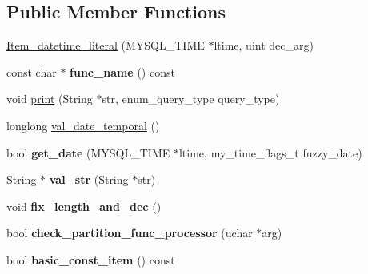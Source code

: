 \subsection*{Public Member Functions}
\begin{DoxyCompactItemize}
\item 
\mbox{\hyperlink{classItem__datetime__literal_a6a462ca295dad345d98d1fc6fa3e6f4d}{Item\+\_\+datetime\+\_\+literal}} (M\+Y\+S\+Q\+L\+\_\+\+T\+I\+ME $\ast$ltime, uint dec\+\_\+arg)
\item 
\mbox{\label{classItem__datetime__literal_a45fe15923fdd61306e141e29367ec34c}} 
const char $\ast$ {\bfseries func\+\_\+name} () const
\item 
void \mbox{\hyperlink{classItem__datetime__literal_a96ac54156ec3267f4913e3fbed7837a1}{print}} (String $\ast$str, enum\+\_\+query\+\_\+type query\+\_\+type)
\item 
longlong \mbox{\hyperlink{classItem__datetime__literal_af205497e535eba297fbdd01b60bb93d9}{val\+\_\+date\+\_\+temporal}} ()
\item 
\mbox{\label{classItem__datetime__literal_a08c45cbebd5dab38391445acd1a4de2f}} 
bool {\bfseries get\+\_\+date} (M\+Y\+S\+Q\+L\+\_\+\+T\+I\+ME $\ast$ltime, my\+\_\+time\+\_\+flags\+\_\+t fuzzy\+\_\+date)
\item 
\mbox{\label{classItem__datetime__literal_a2d3d8f09a0f5a87df61fc74a776e306f}} 
String $\ast$ {\bfseries val\+\_\+str} (String $\ast$str)
\item 
\mbox{\label{classItem__datetime__literal_a90600361f012d627cc6fd628b459279a}} 
void {\bfseries fix\+\_\+length\+\_\+and\+\_\+dec} ()
\item 
\mbox{\label{classItem__datetime__literal_a06c2376252eb6385895311997b0f9b4c}} 
bool {\bfseries check\+\_\+partition\+\_\+func\+\_\+processor} (uchar $\ast$arg)
\item 
\mbox{\label{classItem__datetime__literal_a9cc794df721edb6cdb23ef6ca820998c}} 
bool {\bfseries basic\+\_\+const\+\_\+item} () const
\item 
\mbox{\label{classItem__datetime__literal_a94bef58de54e96b49018de3c3c425f0b}} 

\end{DoxyCompactItemize}
